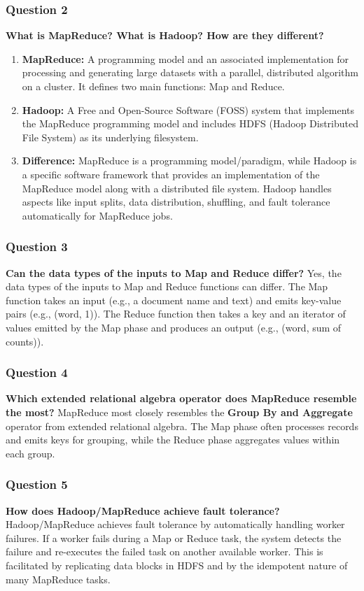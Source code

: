 \documentclass{article}
\begin{document}
\subsubsection*{Question 2}
\textbf{What is MapReduce? What is Hadoop? How are they different?}
    \begin{enumerate}[label=\alph*)]
        \item \textbf{MapReduce:} A programming model and an associated implementation for processing and generating large datasets with a parallel, distributed algorithm on a cluster. It defines two main functions: Map and Reduce.
        \item \textbf{Hadoop:} A Free and Open-Source Software (FOSS) system that implements the MapReduce programming model and includes HDFS (Hadoop Distributed File System) as its underlying filesystem.
        \item \textbf{Difference:} MapReduce is a programming model/paradigm, while Hadoop is a specific software framework that provides an implementation of the MapReduce model along with a distributed file system. Hadoop handles aspects like input splits, data distribution, shuffling, and fault tolerance automatically for MapReduce jobs.
    \end{enumerate}

\subsubsection*{Question 3}
\textbf{Can the data types of the inputs to Map and Reduce differ?}
    Yes, the data types of the inputs to Map and Reduce functions can differ. The Map function takes an input (e.g., a document name and text) and emits key-value pairs (e.g., (word, 1)). The Reduce function then takes a key and an iterator of values emitted by the Map phase and produces an output (e.g., (word, sum of counts)).

\subsubsection*{Question 4}
\textbf{Which extended relational algebra operator does MapReduce resemble the most?}
    MapReduce most closely resembles the \textbf{Group By and Aggregate} operator from extended relational algebra. The Map phase often processes records and emits keys for grouping, while the Reduce phase aggregates values within each group.

\subsubsection*{Question 5}
\textbf{How does Hadoop/MapReduce achieve fault tolerance?}
    Hadoop/MapReduce achieves fault tolerance by automatically handling worker failures. If a worker fails during a Map or Reduce task, the system detects the failure and re-executes the failed task on another available worker. This is facilitated by replicating data blocks in HDFS and by the idempotent nature of many MapReduce tasks.
\end{document}
